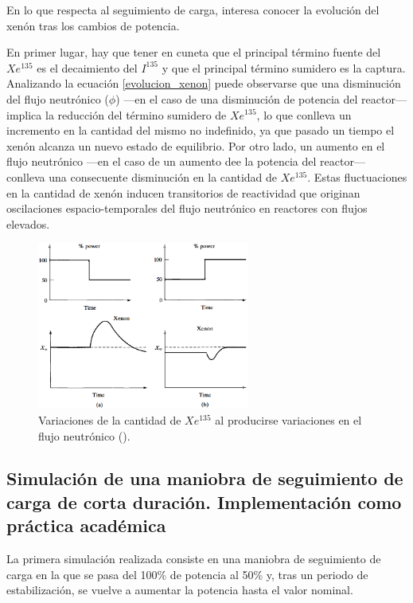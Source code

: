 En lo que respecta al seguimiento de carga, interesa conocer la evolución del xenón tras los cambios de potencia. 

En primer lugar, hay que tener en cuneta que el principal término fuente del $Xe^{135}$ es el decaimiento del $I^{135}$ y que el principal término sumidero es la captura. Analizando la ecuación \ref{evolucion_xenon} puede observarse que una disminución del flujo neutrónico ($\phi$) ---en el caso de una disminución de potencia del reactor--- implica la reducción del término sumidero de  $Xe^{135}$, lo que conlleva un incremento en la cantidad del mismo no indefinido, ya que pasado un tiempo el xenón alcanza un nuevo estado de equilibrio. Por otro lado, un aumento en el flujo neutrónico ---en el caso de un aumento dee la potencia del reactor--- conlleva una consecuente disminución en la cantidad de $Xe^{135}$. Estas fluctuaciones en la cantidad de xenón inducen transitorios de reactividad que
originan oscilaciones espacio-temporales del flujo neutrónico en reactores con flujos elevados.

\begin{figure}[h]
  \centering
  \includegraphics[width=0.62\textwidth]{content/figures/variaciones_potencia_xenon.png}
  \caption{Variaciones de la cantidad de $Xe^{135}$ al producirse variaciones en el flujo neutrónico (\cite{intro_nuclear_engineering}).}
  \label{fig:variaciones_potencia_xenon}
\end{figure}

\subsection{Simulación de una maniobra de seguimiento de carga de corta duración. Implementación como práctica académica}

La primera simulación realizada consiste en una maniobra de seguimiento de carga en la que se pasa del 100\% de potencia al 50\% y, tras un periodo de estabilización, se vuelve a aumentar la potencia hasta el valor nominal.


